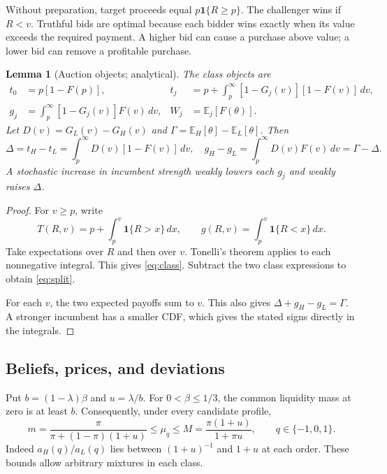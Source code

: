 \documentclass[12pt]{article}
\newtheorem{lemma}{Lemma}
\newcommand{\E}{\mathbb E}
\newcommand{\ind}{\mathbf 1}
\newcommand{\dd}{\,d}
\begin{document}
Without preparation, target proceeds equal $p\ind\{R\ge p\}$.
The challenger wins if $R<v$.
Truthful bids are optimal because each bidder wins exactly when its value exceeds the required payment.
A higher bid can cause a purchase above value; a lower bid can remove a profitable purchase.

\begin{lemma}[Auction objects; analytical]\label{lem:auction}
The class objects are
\begin{align}\label{eq:class}
 t_0&=p[1-F(p)],&
 t_j&=p+\int_p^\infty[1-G_j(v)][1-F(v)]\dd v,\\
 g_j&=\int_p^\infty[1-G_j(v)]F(v)\dd v,&
 W_j&=\E_j[F(\theta)].\nonumber
\end{align}
Let $D(v)=G_L(v)-G_H(v)$ and $\Gamma=\E_H[\theta]-\E_L[\theta]$.
Then
\begin{equation}\label{eq:split}
 \Delta=t_H-t_L=\int_p^\infty D(v)[1-F(v)]\dd v,\quad
 g_H-g_L=\int_p^\infty D(v)F(v)\dd v=\Gamma-\Delta.
\end{equation}
A stochastic increase in incumbent strength weakly lowers each $g_j$ and weakly raises $\Delta$.
\end{lemma}

\begin{proof}
For $v\ge p$, write
\[
 T(R,v)=p+\int_p^v\ind\{R>x\}\dd x,\qquad
 g(R,v)=\int_p^v\ind\{R<x\}\dd x.
\]
Take expectations over $R$ and then over $v$.
Tonelli's theorem applies to each nonnegative integral.
This gives \eqref{eq:class}.
Subtract the two class expressions to obtain \eqref{eq:split}.

For each $v$, the two expected payoffs sum to $v$.
This also gives $\Delta+g_H-g_L=\Gamma$.
A stronger incumbent has a smaller CDF, which gives the stated signs directly in the integrals.
\end{proof}

\subsection{Beliefs, prices, and deviations}
Put $b=(1-\lambda)\beta$ and $u=\lambda/b$.
For $0<\beta\le1/3$, the common liquidity mass at zero is at least $b$.
Consequently, under every candidate profile,
\begin{equation}\label{eq:bounds}
 m=\frac{\pi}{\pi+(1-\pi)(1+u)}\le\mu_q\le
 M=\frac{\pi(1+u)}{1+\pi u},\qquad q\in\{-1,0,1\}.
\end{equation}
Indeed $a_H(q)/a_L(q)$ lies between $(1+u)^{-1}$ and $1+u$ at each order.
These bounds allow arbitrary mixtures in each class.
\end{document}
